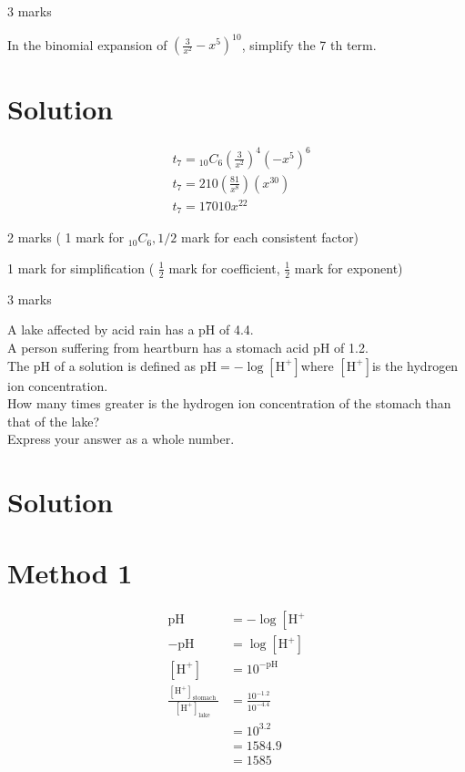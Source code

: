 \documentclass[10pt]{article}
\begin{document}
3 marks

In the binomial expansion of $\left(\frac{3}{x^{2}}-x^{5}\right)^{10}$, simplify the 7 th term.

\section*{Solution}
$$
\begin{aligned}
& t_{7}={ }_{10} C_{6}\left(\frac{3}{x^{2}}\right)^{4}\left(-x^{5}\right)^{6} \\
& t_{7}=210\left(\frac{81}{x^{8}}\right)\left(x^{30}\right) \\
& t_{7}=17010 x^{22}
\end{aligned}
$$

2 marks ( 1 mark for ${ }_{10} C_{6}, 1 / 2$ mark for each consistent factor)

1 mark for simplification ( $\frac{1}{2}$ mark for coefficient, $\frac{1}{2}$ mark for exponent)

3 marks

A lake affected by acid rain has a pH of 4.4.\\
A person suffering from heartburn has a stomach acid pH of 1.2.\\
The pH of a solution is defined as $\mathrm{pH}=-\log \left[\mathrm{H}^{+}\right]$where $\left[\mathrm{H}^{+}\right]$is the hydrogen ion concentration.\\
How many times greater is the hydrogen ion concentration of the stomach than that of the lake?\\
Express your answer as a whole number.

\section*{Solution}
\section*{Method 1}
$$
\begin{aligned}
\mathrm{pH} & =-\log \left[\mathrm{H}^{+}\right. \\
-\mathrm{pH} & =\log \left[\mathrm{H}^{+}\right] \\
{\left[\mathrm{H}^{+}\right] } & =10^{-\mathrm{pH}} \\
\frac{\left[\mathrm{H}^{+}\right]_{\text {stomach }}}{\left[\mathrm{H}^{+}\right]_{\text {lake }}} & =\frac{10^{-1.2}}{10^{-4.4}} \\
& =10^{3.2} \\
& =1584.9 \\
& =1585
\end{aligned}
$$
\end{document}
